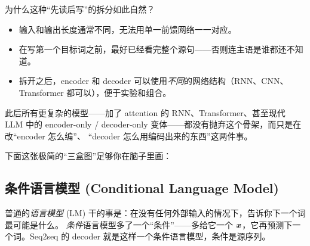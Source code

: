 为什么这种“先读后写”的拆分如此自然？
\begin{itemize}
    \item 输入和输出长度通常不同，无法用单一前馈网络一一对应。
    \item 在写第一个目标词之前，最好已经看完整个源句——否则连主语是谁都还不知道。
    \item 拆开之后，encoder 和 decoder 可以使用\emph{不同}的网络结构（RNN、CNN、Transformer
          都可以），便于实验和组合。
\end{itemize}

\begin{remark}
此后所有更复杂的模型——加了 attention 的 RNN、Transformer、甚至现代 LLM 中的
encoder-only / decoder-only 变体——都没有抛弃这个骨架，而只是在改“encoder 怎么编”、
“decoder 怎么用编码出来的东西”这两件事。
\end{remark}

\medskip
下面这张极简的“三盒图”足够你在脑子里画：

\begin{center}
\end{center}

\subsection{条件语言模型 (Conditional Language Model)}
\label{sec:clm}

\begin{intuitionblock}
普通的\emph{语言模型} (LM) 干的事是：在没有任何外部输入的情况下，告诉你下一个词最可能是什么。
\emph{条件}语言模型多了一个“条件”——多给它一个 $\boldsymbol{x}$，它再预测下一个词。Seq2seq 的 decoder
就是这样一个条件语言模型，条件是源序列。
\end{intuitionblock}

